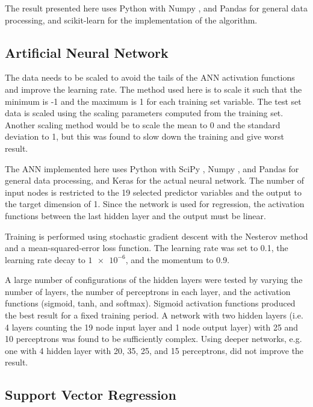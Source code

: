 \documentclass{scrartcl}
\begin{document}
The result presented here uses Python with Numpy \cite{numpy}, and Pandas \cite{pandas} for general data processing, and scikit-learn \cite{scikit-learn} for the implementation of the algorithm.


\subsection{Artificial Neural Network}

The data needs to be scaled to avoid the tails of the \gls{ANN} activation functions and improve the learning rate. The method used here is to scale it such that the minimum is -1 and the maximum is 1 for each training set variable. The test set data is scaled using the scaling parameters computed from the training set. Another scaling method would be to scale the mean to 0 and the standard deviation to 1, but this was found to slow down the training and give worst result.

The \gls{ANN} implemented here uses Python with SciPy \cite{scipy}, Numpy \cite{numpy}, and Pandas \cite{pandas} for general data processing, and Keras \cite{keras} for the actual neural network. The number of input nodes is restricted to the 19 selected predictor variables and the output to the target dimension of 1. Since the network is used for regression, the activation functions between the last hidden layer and the output must be linear.

Training is performed using stochastic gradient descent with the Nesterov method \cite{nesterov} and a mean-squared-error loss function. The learning rate was set to 0.1, the learning rate decay to $\num{1e-6}$, and the momentum to 0.9.

A large number of configurations of the hidden layers were tested by varying the number of layers, the number of perceptrons in each layer, and the activation functions (sigmoid, tanh, and softmax). Sigmoid activation functions produced the best result for a fixed training period. A network with two hidden layers (i.e. 4 layers counting the 19 node input layer and 1 node output layer) with 25 and 10 perceptrons was found to be sufficiently complex. Using deeper networks, e.g. one with 4 hidden layer with 20, 35, 25, and 15 perceptrons, did not improve the result.

\subsection{Support Vector Regression}
\end{document}

